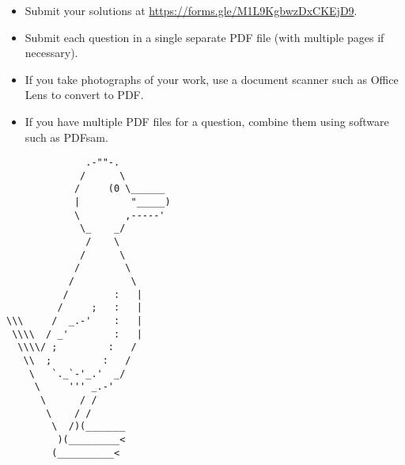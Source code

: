 \documentclass{article}
\begin{document}
\vfill
\begin{itemize}
	\item Submit your solutions at \url{https://forms.gle/M1L9KgbwzDxCKEjD9}.
	\item Submit each question in a single separate PDF file (with multiple pages if necessary).
	\item If you take photographs of your work, use a document scanner such as Office Lens to convert to PDF.
	\item If you have multiple PDF files for a question, combine them using software such as PDFsam.
\end{itemize}

\vfill
\centering
\tiny
\begin{BVerbatim}
              .-""-.
             /      \
            /     (0 \______
            |         "_____)
            \        ,-----'
             \_    _/
              /    \
             /      \
            /        \
           /          \
          /        :   |
         /     ;   :   |
\\\     /  _.-'    :   |
 \\\\  / _'        :   |
  \\\\/ ;         :   /
   \\  ;         :   /
    \   `._`-'_.'  _/
     \     ''' _.-'
      \      / /
       \    / /
        \  /)(_______
         )(_________<
        (__________<
\end{BVerbatim}
\end{document}
